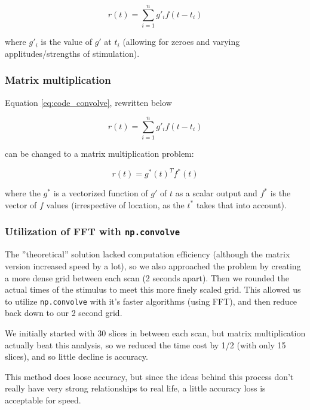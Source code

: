 \documentclass[11pt]{article}
\begin{document}
\begin{equation} \label{eq:code_convolve}
r(t)= \sum_{i=1}^n g'_{i} f(t-t_i)
\end{equation}

where $g'_{i}$ is the value of $g'$ at $t_i$ (allowing for zeroes and varying applitudes/strengths of stimulation).


\subsubsection{Matrix multiplication}
Equation \ref{eq:code_convolve}, rewritten below

$$r(t)= \sum_{i=1}^n g'_{i} f(t-t_i)$$

can be changed to a matrix multiplication problem:

\begin{equation} \label{eq:matrix_code_convolve}
r(t)=  g^*(t)^T f^*(t)
\end{equation}

where the $g^*$ is a vectorized function of $g'$ of $t$ as a scalar output and $f^*$ is the vector of $f$ values (irrespective of location, as the $t^*$ takes that into account).


\subsubsection{Utilization of FFT with \texttt{np.convolve}}
The ''theoretical'' solution lacked computation efficiency (although the matrix version increased speed by a lot), so we also approached the problem by creating a more dense grid between each scan (2 seconds apart). Then we rounded the actual times of the stimulus to meet this more finely scaled grid. This allowed us to utilize \texttt{np.convolve} with it's faster algorithms (using FFT), and then reduce back down to our 2 second grid.

We initially started with 30 slices in between each scan, but matrix multiplication actually beat this analysis, so we reduced the time cost by 1/2 (with only 15 slices), and so little decline is accuracy.

This method does loose accuracy, but since the ideas behind this process don't really have very strong relationships to real life, a little accuracy loss is acceptable for speed.





\end{document}
